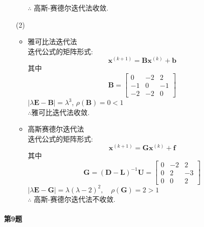 \documentclass[a4paper]{article}
\begin{document}
\begin{enumerate}
\begin{itemize}
        $\therefore$ 高斯-赛德尔迭代法收敛.
    \end{itemize}
    \item [(2)]
    \begin{itemize}
        \item 雅可比法迭代法 \\
        迭代公式的矩阵形式:$$\boldsymbol{x}^{(k+1)} = \boldsymbol{B}\boldsymbol{x}^{(k)} + \boldsymbol{b}$$
        其中
        \begin{equation}
            \boldsymbol{B} =\left[\begin{array}{rrr}0 & -2 & 2 \\ -1 & 0 & -1 \\ -2 & -2 & 0\end{array}\right] \nonumber
        \end{equation}
        $\left|\lambda \boldsymbol{E}-\mathbf{B}\right|=\lambda^3$, $\rho\left(\boldsymbol{B}\right)=0 < 1$ \\
        $\therefore$雅可比迭代法收敛.
        \item 高斯赛德尔迭代法 \\
        迭代公式的矩阵形式:$$\boldsymbol{x}^{(k+1)} = \boldsymbol{G}\boldsymbol{x}^{(k)} + \boldsymbol{f}$$
        其中
        \begin{equation}
            \boldsymbol{G}=(\boldsymbol{D}-\mathbf{L})^{-1} \mathbf{U}=\left[\begin{array}{rrr}0 & -2 & 2 \\ 0 & 2 & -3 \\ 0 & 0 & 2\end{array}\right] \nonumber
        \end{equation}
        $\mid \lambda \boldsymbol{E}-\boldsymbol{G} \mid=\lambda(\lambda-2)^{2}, \quad \rho\left(\boldsymbol{G}\right)=2>1$ \\
        $\therefore$ 高斯-赛德尔迭代法不收敛.
    \end{itemize}
\end{enumerate}

\paragraph{第9题}~{}
\\
\end{document}
